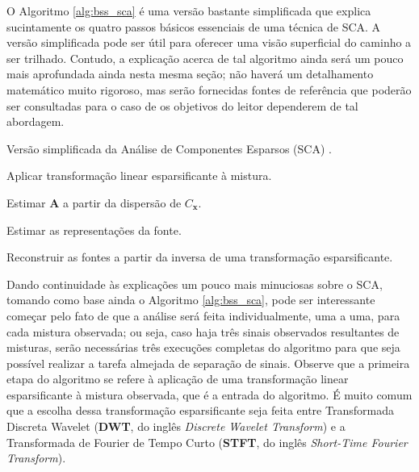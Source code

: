 O Algoritmo \ref{alg:bss_sca} é uma versão bastante simplificada que explica sucintamente os quatro passos básicos essenciais de uma técnica de SCA. A versão simplificada pode ser útil para oferecer uma visão superficial do caminho a ser trilhado. Contudo, a explicação acerca de tal algoritmo ainda será um pouco mais aprofundada ainda nesta mesma seção; não haverá um detalhamento matemático muito rigoroso, mas serão fornecidas fontes de referência que poderão ser consultadas para o caso de os objetivos do leitor dependerem de tal abordagem. \\

\begin{algorithm}[H]
    \caption{Versão simplificada da Análise de Componentes Esparsos (SCA) \citep{gribonval2006survey}.}
    \label{alg:bss_sca}
    \begin{algorithmic}[1]

        \State Aplicar transformação linear esparsificante à mistura.

        \State Estimar $\bm{A}$ a partir da dispersão de $C_{\bm{x}}$.

        \State Estimar as representações da fonte.

        \State Reconstruir as fontes a partir da inversa de uma transformação esparsificante.

    \end{algorithmic}

\end{algorithm}

Dando continuidade às explicações um pouco mais minuciosas sobre o SCA, tomando como base ainda o Algoritmo \ref{alg:bss_sca}, pode ser interessante começar pelo fato de que a análise será feita individualmente, uma a uma, para cada mistura observada; ou seja, caso haja três sinais observados resultantes de misturas, serão necessárias três execuções completas do algoritmo para que seja possível realizar a tarefa almejada de separação de sinais. Observe que a primeira etapa do algoritmo se refere à aplicação de uma transformação linear esparsificante à mistura observada, que é a entrada do algoritmo. É muito comum que a escolha dessa transformação esparsificante seja feita entre Transformada Discreta Wavelet (\textbf{DWT}, do inglês \textit{Discrete Wavelet Transform}) e a Transformada de Fourier de Tempo Curto (\textbf{STFT}, do inglês \textit{Short-Time Fourier Transform}).







